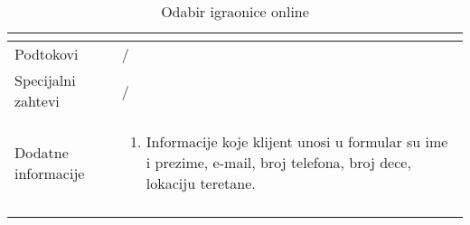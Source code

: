 \documentclass[../../main.tex]{subfiles}
\begin{document}
\begin{longtable}{| p{} | p{} |}
\begin{itemize}
    \end{itemize} \\
\hline
    Podtokovi & /\\
\hline
    Specijalni zahtevi & /\\
\hline
    Dodatne informacije &
    \begin{enumerate}
        \item Informacije koje klijent unosi u formular su ime i prezime, e-mail, broj telefona, broj dece, lokaciju teretane.
    \end{enumerate}\\
\hline
\caption{Odabir igraonice online}
\end{longtable}
\end{document}

